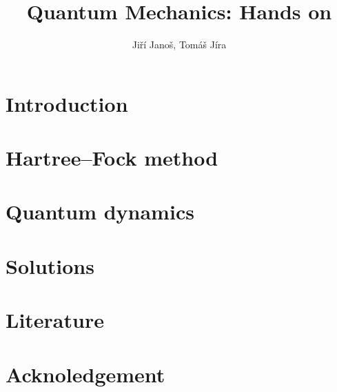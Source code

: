\documentclass[paper=b5,parskip=half,open=any,headsepline=true,11pt]{scrbook}
\title{Quantum Mechanics: Hands on}
\author{Jiří Janoš, Tomáš Jíra}
\begin{document}
\frontmatter
\pagestyle{scrheadings}



\tableofcontents

\chapter{Introduction}
\label{kap:uvod}


\mainmatter

\chapter{Hartree--Fock method}
\label{kap:hf}


\chapter{Quantum dynamics}
\label{kap:qd}


\chapter{Solutions}
\label{kap:sol}





\chapter{Literature}
\label{kap:literatura}


% 

\chapter{Acknoledgement}
\label{kap:podekovani}


\printglossary
\printglossary[type=\acronymtype,title=List of acronyms]


\renewcommand*{\lstlistlistingname}{List of codes}
\lstlistoflistings
{}

\backmatter
\printindex
\end{document}
